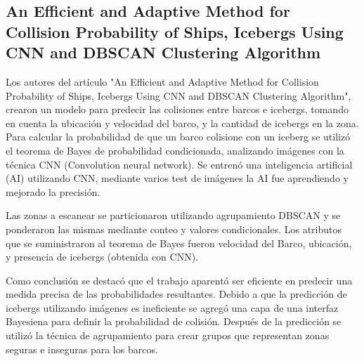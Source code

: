 \subsection{An Efficient and Adaptive Method for Collision
            Probability of Ships, Icebergs Using CNN
            and DBSCAN Clustering Algorithm
}

Los autores del artículo "An Efficient and Adaptive Method for Collision
Probability of Ships, Icebergs Using CNN
and DBSCAN Clustering Algorithm"\cite[pág. 20]{somaniEmerging2019}, crearon un modelo para predecir las colisiones entre barcos e icebergs,
tomando en cuenta la ubicación y velocidad del barco, y la cantidad de icebergs en la zona.
Para calcular la probabilidad de que un barco colisione con un iceberg
se utilizó el teorema de Bayes de probabilidad condicionada, analizando imágenes con la técnica CNN (Convolution neural network).
Se entrenó una inteligencia artificial (AI) utilizando CNN, mediante varios test de imágenes la AI fue aprendiendo
y mejorado la precisión.\par

Las zonas a escanear se particionaron utilizando agrupamiento DBSCAN  y se ponderaron
las mismas mediante conteo y valores condicionales. Los atributos que se suministraron al teorema de Bayes fueron
velocidad del Barco, ubicación, y presencia de icebergs (obtenida con CNN).\par

Como conclusión se destacó que el trabajo aparentó ser eficiente en predecir
una medida precisa de  las probabilidades resultantes.
Debido a que la predicción de icebergs utilizando imágenes es ineficiente se agregó una capa de una interfaz Bayesiena
para definir la probabilidad de colisión. Después de la predicción se utilizó
la técnica de agrupamiento para crear grupos que representan zonas seguras e inseguras para los barcos.\par